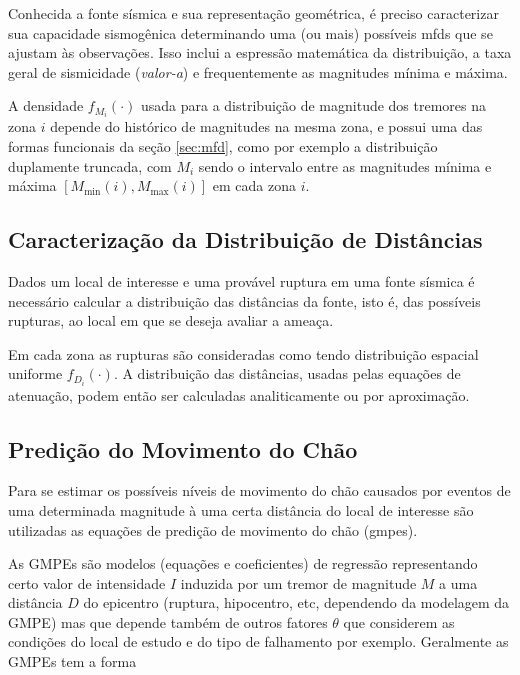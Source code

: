 Conhecida a fonte sísmica e sua representação geométrica, é preciso caracterizar sua capacidade sismogênica determinando
uma (ou mais) possíveis \gls{mfd}s que se ajustam às observações. Isso inclui a espressão matemática da distribuição, a
taxa geral de sismicidade (\emph{valor-a}) e frequentemente as magnitudes mínima e máxima. 


A densidade $f_{M_i}(\cdot)$ usada para a distribuição de magnitude dos tremores na zona $i$ depende do 
histórico de magnitudes na mesma zona, e possui uma das formas funcionais da seção \ref{sec:mfd},
como por exemplo a distribuição duplamente truncada,
com $M_i$ sendo o intervalo entre as magnitudes mínima e máxima $[M_{\min}(i), M_{\max}(i)]$ 
em cada zona $i$.


\subsection{Caracterização da Distribuição de Distâncias}
\label{sec:psha_distances}

Dados um local de interesse e uma provável ruptura em uma fonte sísmica é necessário calcular a distribuição das
distâncias da fonte, isto é, das possíveis rupturas, ao local em que se deseja avaliar a ameaça.

Em cada zona as rupturas são consideradas como tendo distribuição espacial uniforme $f_{D_i}(\cdot)$.
A distribuição das distâncias, usadas pelas equações de atenuação, podem então ser calculadas 
analiticamente ou por aproximação.


\subsection{Predição do Movimento do Chão}
\label{sec:gmpe}

Para se estimar os possíveis níveis de movimento do chão causados por eventos de uma determinada magnitude à uma certa
distância do local de interesse são utilizadas as equações de predição de movimento do chão (\glspl{gmpe}).

As GMPEs são modelos (equações e coeficientes) de regressão representando certo valor de
intensidade $I$ induzida por um tremor de magnitude $M$ a uma distância $D$ do epicentro (ruptura, hipocentro, etc, dependendo da
modelagem da GMPE) mas que depende também de outros fatores $\theta$ que considerem as condições
do local de estudo e do tipo de falhamento por exemplo. Geralmente as GMPEs tem a forma

